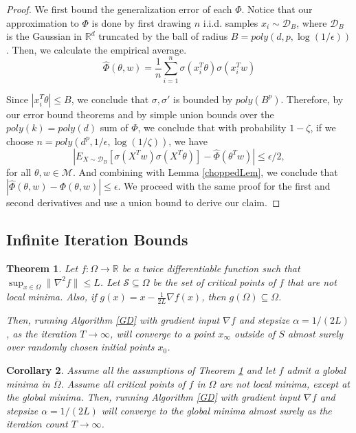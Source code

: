 \documentclass{article}
\newtheorem{theorem}{Theorem}[section]
\newtheorem{corollary}[theorem]{Corollary}
\newcommand{\R}{{\mathbb{R}}}
\begin{document}
\begin{proof}
  We first bound the generalization error of each $\Phi$. Notice that
  our approximation to $\Phi$ is done by first drawing $n$
  i.i.d. samples $x_i \sim \mathcal{D}_B$, where $\mathcal{D}_B$ is
  the Gaussian in $\R^d$ truncated by the ball of radius
  $B = poly(d,p,\log(1/\epsilon))$. Then, we calculate the empirical
  average.
%
\[\widehat{\Phi}(\theta,w) = \frac{1}{n}\sum_{i=1}^n \sigma(x_i^T\theta)\sigma(x_i^Tw) \]

Since $|x_i^T\theta|\leq B$, we conclude that $\sigma, \sigma'$ is bounded by $poly(B^p)$. Therefore, by our error bound theorems and by simple union bounds over the $poly(k) = poly(d)$ sum of $\Phi$, we conclude that with probability $1-\zeta$, if we choose $n = poly(d^p,1/\epsilon, \log(1/\zeta))$, we have 
%
\[|E_{X\sim \mathcal{D}_B}[\sigma(X^Tw)\sigma(X^T\theta)] -
\widehat{\Phi}(\theta^Tw)| \leq \epsilon/2,\]
for all $\theta, w \in \mathcal{M}$. And combining with Lemma
\ref{choppedLem}, we conclude that
$|\widehat{\Phi}(\theta,w) - \Phi(\theta,w)|\leq \epsilon$. We proceed
with the same proof for the first and second derivatives and use a
union bound to derive our claim.
\end{proof}

\subsection{Infinite Iteration Bounds} 
\label{InfIter}


\begin{theorem}\cite{lee2016gradient, PanageasP16}\label{convStrict}
  Let $f :\Omega \to \R$ be a twice differentiable function such that
  $\sup_{x \in \Omega} \|\nabla^2 f\| \leq L$. Let
  $\mathcal{S} \subseteq \Omega$ be the set of critical points of $f$
  that are not local minima. Also, if
  $g(x) = x - \frac{1}{2L} \nabla f(x)$, then
  $g(\Omega) \subseteq \Omega$.

  Then, running Algorithm \ref{GD} with gradient input $\nabla f$ and
  stepsize $\alpha = 1/(2L)$, as the iteration $T \to\infty$, will
  converge to a point $x_\infty$ outside of $S$ almost surely over
  randomly chosen initial points $x_0$.
\end{theorem}

\begin{corollary}
Assume all the assumptions of Theorem \ref{convStrict} and let $f$ admit a global minima in $\overline{\Omega}$. Assume all critical points of $f$ in $\Omega$ are not local minima, except at the global minima. Then, running Algorithm \ref{GD} with gradient input $\nabla f$ and stepsize $\alpha = 1/(2L)$ will converge to the global minima almost surely as the iteration count $T \to\infty$.
\end{corollary}
\end{document}
